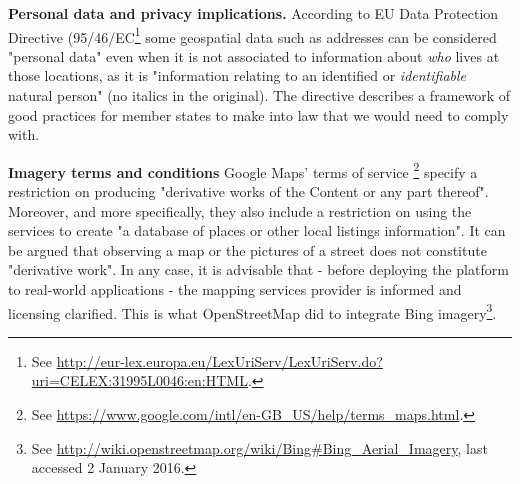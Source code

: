 \textbf{Personal data and privacy implications.} According to EU Data Protection Directive (95/46/EC\footnote{See \url{http://eur-lex.europa.eu/LexUriServ/LexUriServ.do?uri=CELEX:31995L0046:en:HTML}.} some geospatial data such as addresses can be considered "personal data" even when it is not associated to information about {\it who} lives at those locations, as it is "information relating to an identified or {\it identifiable} natural person" (no italics in the original). The directive describes a framework of good practices for member states to make into law that we would need to comply with.
	
\textbf{Imagery terms and conditions} Google Maps' terms of service \footnote{See \url{https://www.google.com/intl/en-GB_US/help/terms_maps.html}.} specify a restriction on producing "derivative works of the Content or any part thereof". Moreover, and more specifically, they also include a restriction on using the services to create "a database of places or other local listings information". It can be argued that observing a map or the pictures of a street does not constitute "derivative work". In any case, it is advisable that - before deploying the platform to real-world applications - the mapping services provider is informed and licensing clarified. This is what OpenStreetMap did to integrate Bing imagery\footnote{See \url{http://wiki.openstreetmap.org/wiki/Bing#Bing_Aerial_Imagery}, last accessed 2 January 2016.}.
